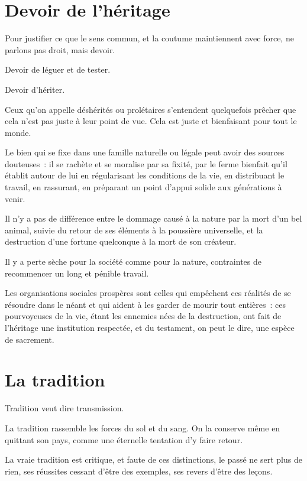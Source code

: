 \documentclass[french,twoside]{book} %
\newcommand{\astermono}{\medskip\centerline{\color{rubric}\large\selectfont{\syms ✻}}\medskip\par}%
\begin{document}
\section[Devoir de l’héritage]{Devoir de l’héritage}
\noindent Pour justifier ce que le sens commun, et la coutume maintiennent avec force, ne parlons pas droit, mais devoir.\par
Devoir de léguer et de tester.\par
Devoir d’hériter.\par
Ceux qu’on appelle déshérités ou prolétaires s’entendent quelquefois prêcher que cela n’est pas juste à leur point de vue. Cela est juste et bienfaisant pour tout le monde.\par
Le bien qui se fixe dans une famille naturelle ou légale peut avoir des sources douteuses : il se rachète et se moralise par sa fixité, par le ferme bienfait qu’il établit autour de lui en régularisant les conditions de la vie, en distribuant le travail, en rassurant, en préparant un point d’appui solide aux générations à venir.\par
Il n’y a pas de différence entre le dommage causé à la nature par la mort d’un bel animal, suivie du retour de ses éléments à la poussière universelle, et la destruction d’une fortune quelconque à la mort de son créateur.\par
Il y a perte sèche pour la société comme pour la nature, contraintes de recommencer un long et pénible travail.\par
Les organisations sociales prospères sont celles qui empêchent ces réalités de se résoudre dans le néant et qui aident à les garder de mourir tout entières : ces pourvoyeuses de la vie, étant les ennemies nées de la destruction, ont fait de l’héritage une institution respectée, et du testament, on peut le dire, une espèce de sacrement.
\section[La tradition]{La tradition}
\noindent Tradition veut dire transmission.\par

\astermono

\noindent La tradition rassemble les forces du sol et du sang. On la conserve même en quittant son pays, comme une éternelle tentation d’y faire retour.\par

\astermono

\noindent La vraie tradition est critique, et faute de ces distinctions, le passé ne sert plus de rien, ses réussites cessant d’être des exemples, ses revers d’être des leçons.\par
\end{document}
